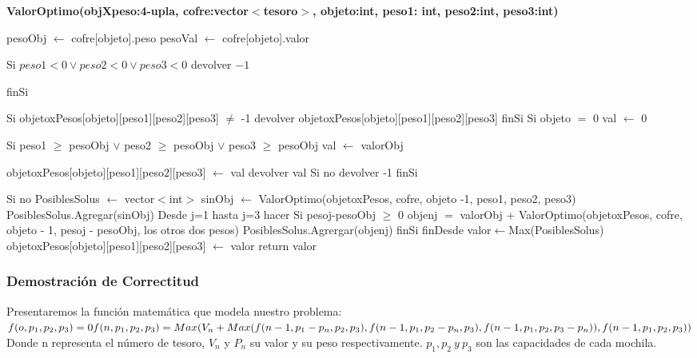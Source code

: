 \documentclass[spanish,12pt]{article}
\begin{document}
\begin{algorithm}[H]{\textbf{ValorOptimo(objXpeso:4-upla, cofre:vector$<$tesoro$>$, objeto:int, peso1: int, peso2:int, peso3:int)}}
	\begin{algorithmic}[1]
		\State  pesoObj $\gets$ cofre[objeto].peso 
		\State  pesoVal $\gets$ cofre[objeto].valor 

		\State Si $peso1 < 0 \vee peso2 < 0 \vee peso3 < 0$
			\State \quad devolver $-1$ 

		\State finSi

		\State Si objetoxPesos[objeto][peso1][peso2][peso3] $\neq$ -1
			\State \quad devolver objetoxPesos[objeto][peso1][peso2][peso3] 
		\State finSi
		\State Si objeto $=$ 0
			\State \quad val $\gets$ 0 

			\State \quad Si peso1 $\ge$ pesoObj $\vee$ peso2 $\ge$ pesoObj $\vee$ peso3 $\ge$ pesoObj
				\State\quad \quad  val $\gets$ valorObj 

				\State \quad \quad objetoxPesos[objeto][peso1][peso2][peso3] $\gets$ val 
				\State \quad \quad devolver val
			\State \quad Si no
				\State \quad \quad devolver -1 %
			\State \quad finSi

		\State Si no
			\State \quad PosiblesSolus $\gets$ vector$<$int$>$ 
			\State \quad sinObj $\gets$ ValorOptimo(objetoxPesos, cofre, objeto -1, peso1, peso2, peso3)
			\State \quad PosiblesSolus.Agregar(sinObj)
			\State \quad Desde j=1 hasta j=3 hacer
				\State \quad \quad Si pesoj-pesoObj $\ge$ 0
					\State \quad \quad \quad objenj $=$ valorObj + ValorOptimo(objetoxPesos, cofre, objeto - 1, pesoj - pesoObj, los otros dos pesos)
					\State \quad \quad \quad PosiblesSolus.Agrergar(objenj)
				\State \quad \quad finSi
			\State \quad finDesde	
			\State \quad  valor$\gets$Max(PosiblesSolus)
			\State \quad objetoxPesos[objeto][peso1][peso2][peso3] $\gets$ valor
			\State \quad return valor
		\EndIf


	\end{algorithmic}
\end{algorithm}

\newpage

\subsubsection{Demostración de Correctitud}
Presentaremos la función matemática que modela nuestro problema:\\ %

$f(o,p_{1},p_{2},p_{3})=0 \\
f(n,p_{1},p_{2},p_{3}) = Max(V_{n}+Max(f(n-1,p_{1}-p_{n},p_{2},p_{3}), f(n-1,p_{1},p_{2}-p_{n},p_{3}), f(n-1,p_{1},p_{2},p_{3}-p_{n})),f(n-1,p_{1},p_{2},p_{3})) $
\\
Donde n representa el número de tesoro, $V_{n}$ y $P_{n}$ su valor y su peso respectivamente. $p_{1},p_{2}\ y \ p_{3}$ son las capacidades de cada mochila.
\end{document}
